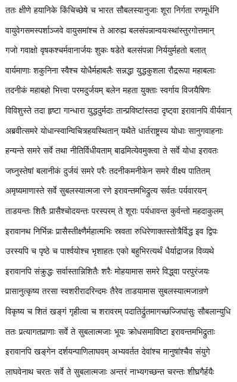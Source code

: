 \twolineshloka
{ततः क्षीणे हयानिके किंचिच्छेषे च भारत}
{सौबलस्यानुजाः शूरा निर्गता रणमूर्धनि}


\twolineshloka
{वायुवेगसमस्पर्शाञ्जवे वायुसमांश्च ते}
{आरुह्य बलसंपन्नान्वयःस्थांस्तुरगोत्तमान्}


\twolineshloka
{गजो गवाक्षो वृषकश्चर्मवानार्जयः शुकः}
{षडेते बलसंपन्ना निर्ययुर्महतो बलात्}


\twolineshloka
{वार्यमाणाः शकुनिना स्वैश्च योधैर्महाबलैः}
{सन्नद्धा युद्धकुशला रौद्ररूपा महाबलाः}


\twolineshloka
{तदनीकं महाबहो भित्त्वा परमदुर्जयम्}
{बलेन महता युक्ताः स्वर्गाय विजयैषिणः}


\twolineshloka
{विविशुस्ते तदा हृष्टा गान्धारा युद्धदुर्मदाः}
{तान्प्रविष्टांस्तदा दृष्ट्वा इरावानपि वीर्यवान्}


\twolineshloka
{अब्रवीत्समरे योधान्स्वान्विचित्रहयस्थितान्}
{यथैते धार्तराष्ट्रस्य योधाः सानुगवाहनाः}


\twolineshloka
{हन्यन्ते समरे सर्वे तथा नीतिर्विधीयताम्}
{बाढमित्येवमुक्त्वा ते सर्वे योधा इरावतः}


\twolineshloka
{जघ्नुस्तेषां बलानीकं दुर्जयं समरे परैः}
{तदनीकमनीकेन समरे वीक्ष्य पातितम्}


\twolineshloka
{अमृष्यमाणास्ते सर्वे सुबलस्यात्मजा रणे}
{इरावन्तमभिद्रुत्य सर्वतः पर्यवारयन्}


\twolineshloka
{ताडयन्तः शितैः प्रासैश्चोदयन्तः परस्परम्}
{ते शूराः पर्यधावन्त कुर्वन्तो महदाकुलम्}


\twolineshloka
{इरावानथ निर्भिन्नः प्रासैस्तीक्ष्णैर्महात्मभिः}
{स्रवता रुधिरेणाक्तस्तोत्रैर्विद्ध इव द्विपः}


\twolineshloka
{उरस्यपि च पृष्ठे च पार्श्वयोश्च भृशाहतः}
{एको बहुभिरत्यर्थं धैर्याद्राजन्न विव्यथे}


\twolineshloka
{इरावानपि संक्रुद्धः सर्वास्तान्निशितैः शरैः}
{मोहयामास समरे विद्ध्वा परपुरंजयः}


\twolineshloka
{प्रासानुत्कृष्य तरसा स्वशरीरादरिन्दमः}
{तैरेव ताडयामास सुबलस्यात्मजान्रणे}


\twolineshloka
{विकृष्य च शितं खङ्गं गृहीत्वा च शरावरम्}
{पदातिर्द्रुतमागच्छज्जिघांसुः सौबलान्युधि}


\twolineshloka
{ततः प्रत्यागतप्राणाः सर्वे ते सुबलात्मजाः}
{भूयः क्रोधसमाविष्टा इरावन्तमभिद्रुताः}


\twolineshloka
{इरावानपि खङ्गेन दर्शयन्पाणिलाघवम्}
{अभ्यवर्तत देवांश्च मानुषांश्चैव संयुगे}


\twolineshloka
{लाघवेनाथ चरतः सर्वे ते सुबलात्मजाः}
{अन्तरं नाभ्यगच्छन्त चरन्तः शीघ्रगैर्हयैः}



